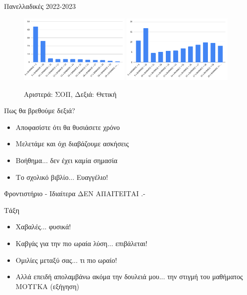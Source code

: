 \documentclass{presentation}
\begin{document}
\begin{frame}{Πανελλαδικές 2022-2023}
  \begin{figure}
    \centering
    \includegraphics[width=0.48\textwidth]{"images/panelladikes22sop.png"}
    \includegraphics[width=0.48\textwidth]{"images/panelladikes22thet.png"}
    \caption{Αριστερά: ΣΟΠ, Δεξιά: Θετική}
  \end{figure}
\end{frame}

\begin{frame}{Πως θα βρεθούμε δεξιά?}
  \begin{itemize}
    \item Αποφασίστε ότι θα θυσιάσετε χρόνο \pause
    \item Μελετάμε και όχι διαβάζουμε ασκήσεις \pause
    \item Βοήθημα... δεν έχει καμία σημασία \pause
    \item Το σχολικό βιβλίο... Ευαγγέλιο!
  \end{itemize}
\end{frame}

\begin{frame}{Φροντιστήριο - Ιδιαίτερα}
  \centering
  ΔΕΝ ΑΠΑΙΤΕΙΤΑΙ .-

\end{frame}

\begin{frame}{Τάξη}
  \begin{itemize}
    \item Χαβαλές... φυσικά! \pause
    \item Καβγάς για την πιο ωραία λύση... επιβάλεται! \pause
    \item Ομιλίες μεταξύ σας... τι πιο ωραίο! \pause
    \item Αλλά επειδή απολαμβάνω ακόμα την δουλειά μου... την στιγμή του μαθήματος ΜΟΥΓΚΑ (εξήγηση)
  \end{itemize}
\end{frame}
\end{document}
